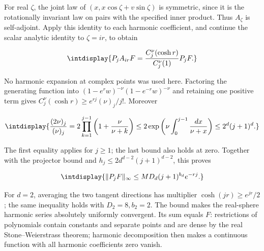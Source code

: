 For real \(\zeta\), the joint law of \((x,\allowbreak x\cos\zeta+v\sin\zeta)\) is symmetric, since it is the rotationally invariant law on pairs with the specified inner product. Thus \(A_\zeta\) is self-adjoint. Apply this identity to each harmonic coefficient, and continue the scalar analytic identity to \(\zeta=ir\), to obtain


\begingroup\renewcommand{\theHequation}{intdisplay.556}
\begin{equation*}
\intdisplay{
P_jA_{ir}F=\frac{C_j^\nu(\cosh r)}{C_j^\nu(1)}P_jF.
}
\end{equation*}
\endgroup


No harmonic expansion at complex points was used here. Factoring the generating function into \((1-e^rw)^{-\nu}(1-e^{-r}w)^{-\nu}\) and retaining one positive term gives \(C_j^\nu(\cosh r)\ge e^{rj}(\nu)_j/j!\). Moreover


\begingroup\renewcommand{\theHequation}{intdisplay.557}
\begin{equation*}
\intdisplay{
\frac{(2\nu)_j}{(\nu)_j}
 =2\prod_{k=1}^{j-1}\left(1+\frac\nu{\nu+k}\right)
 \le2\exp\left(\nu\int_0^{j-1}\frac{dx}{\nu+x}\right)
 \le2^d(j+1)^d.
}
\end{equation*}
\endgroup


The first equality applies for \(j\ge1\); the last bound also holds at zero. Together with the projector bound and \(h_j\le2d^{d-2}(j+1)^{d-2}\), this proves


\begingroup\renewcommand{\theHequation}{intdisplay.558}
\begin{equation}
\intdisplay{
\|P_jF\|_\infty\le MD_d(j+1)^{b_d}e^{-rj}.
}
\label{int:eq-0232-harmonic-decay}
\end{equation}
\endgroup


For \(d=2\), averaging the two tangent directions has multiplier \(\cosh(jr)\ge e^{jr}/2\); the same inequality holds with \(D_2=8,\allowbreak b_2=2\). The bound makes the real-sphere harmonic series absolutely uniformly convergent. Its sum equals \(F\): restrictions of polynomials contain constants and separate points and are dense by the real Stone--Weierstrass theorem; harmonic decomposition then makes a continuous function with all harmonic coefficients zero vanish.


